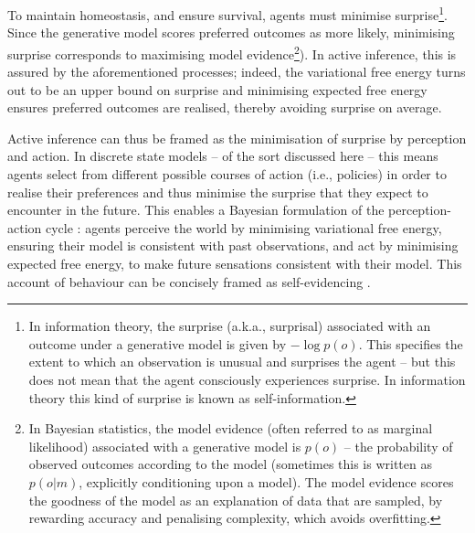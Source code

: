 \documentclass{article}
\begin{document}
To maintain homeostasis, and ensure survival, agents must minimise surprise\footnote{In information theory, the surprise (a.k.a., surprisal) associated with an outcome under a generative model is given by $-\log p(o)$. This specifies the extent to which an observation is unusual and surprises the agent – but this does not mean that the agent consciously experiences surprise. In information theory this kind of surprise is known as self-information.}. Since the generative model scores preferred outcomes as more likely, minimising surprise corresponds to maximising model evidence\footnote{In Bayesian statistics, the model evidence (often referred to as marginal likelihood) associated with a generative model is $p(o)$ -- the probability of observed outcomes according to the model (sometimes this is written as $p(o|m)$, explicitly conditioning upon a model). The model evidence scores the goodness of the model as an explanation of data that are sampled, by rewarding accuracy and penalising complexity, which avoids overfitting.}). In active inference, this is assured by the aforementioned processes; indeed, the variational free energy turns out to be an upper bound on surprise and minimising expected free energy ensures preferred outcomes are realised, thereby avoiding surprise on average.

Active inference can thus be framed as the minimisation of surprise \cite{fristonFreeenergyPrincipleRough2009,fristonFreeenergyPrincipleUnified2010,fristonFreeenergyBrain2007,fristonFreeEnergyPrinciple2006} by perception and action. In discrete state models -- of the sort discussed here -- this means agents select from different possible courses of action (i.e., policies) in order to realise their preferences and thus minimise the surprise that they expect to encounter in the future. This enables a Bayesian formulation of the perception-action cycle \cite{fusterPrefrontalCortexBridging1990}: agents perceive the world by minimising variational free energy, ensuring their model is consistent with past observations, and act by minimising expected free energy, to make future sensations consistent with their model. This account of behaviour can be concisely framed as self-evidencing \cite{hohwySelfEvidencingBrain2016}.
\end{document}

